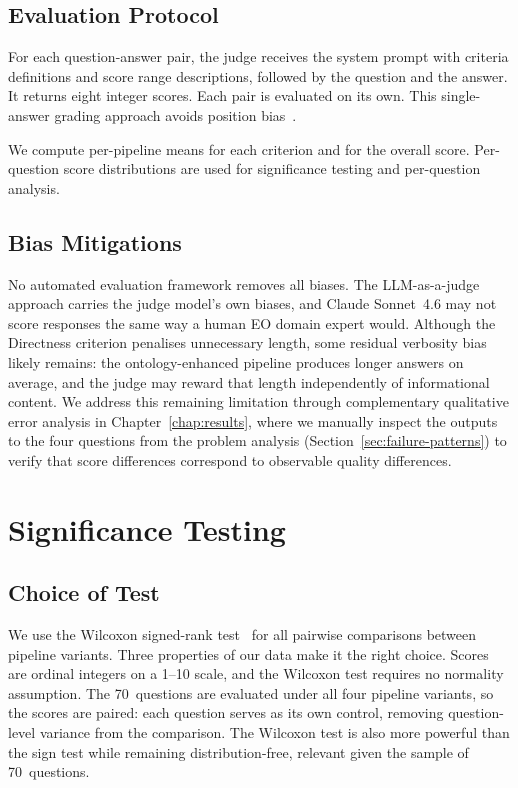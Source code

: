 \subsection{Evaluation Protocol}
\label{subsec:eval-protocol}

For each question-answer pair, the judge receives the system prompt with criteria definitions and score range descriptions, followed by the question and the answer. It returns eight integer scores. Each pair is evaluated on its own. This single-answer grading approach avoids position bias~\citep{zheng2023judging}.

We compute per-pipeline means for each criterion and for the overall score. Per-question score distributions are used for significance testing and per-question analysis.

\subsection{Bias Mitigations}
\label{subsec:bias-mitigations}

No automated evaluation framework removes all biases. The LLM-as-a-judge approach carries the judge model's own biases, and Claude Sonnet~4.6 may not score responses the same way a human EO domain expert would. Although the Directness criterion penalises unnecessary length, some residual verbosity bias likely remains: the ontology-enhanced pipeline produces longer answers on average, and the judge may reward that length independently of informational content. We address this remaining limitation through complementary qualitative error analysis in Chapter~\ref{chap:results}, where we manually inspect the outputs to the four questions from the problem analysis (Section~\ref{sec:failure-patterns}) to verify that score differences correspond to observable quality differences.

\section{Significance Testing}
\label{sec:significance-testing}

\subsection{Choice of Test}
\label{subsec:test-choice}

We use the Wilcoxon signed-rank test~\citep{wilcoxon1945individual} for all pairwise comparisons between pipeline variants. Three properties of our data make it the right choice. Scores are ordinal integers on a 1--10 scale, and the Wilcoxon test requires no normality assumption. The 70~questions are evaluated under all four pipeline variants, so the scores are paired: each question serves as its own control, removing question-level variance from the comparison. The Wilcoxon test is also more powerful than the sign test while remaining distribution-free, relevant given the sample of 70~questions.

